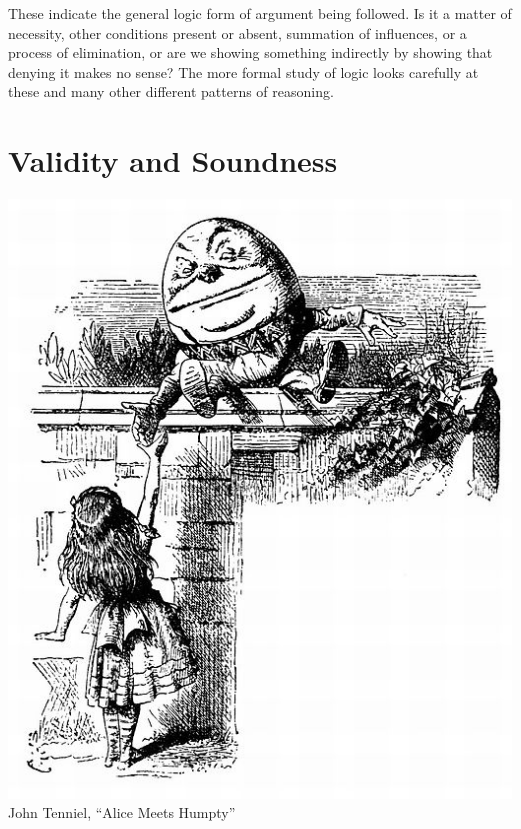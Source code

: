 \documentclass[justified]{tufte-book}
\begin{document}
These indicate the general logic form of argument being followed. Is it a matter of necessity, other conditions present or absent, summation of influences, or a process of elimination, or are we showing something indirectly by showing that denying it makes no sense? The more formal study of logic looks carefully at these and many other different patterns of reasoning.

\hypertarget{validity-and-soundness}{%
\section{Validity and Soundness}\label{validity-and-soundness}}

\begin{marginfigure}
\includegraphics{img/tenniel-alice-humpty.jpg} John Tenniel, ``Alice
Meets Humpty''
\end{marginfigure}
\end{document}
